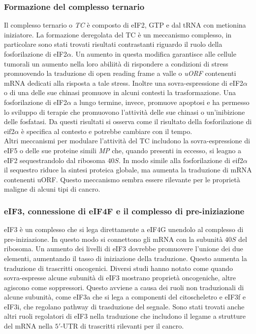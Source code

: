 		\subsubsection{Formazione del complesso ternario}
		Il complesso ternario o \emph{TC} \`e composto di eIF2, GTP e dal tRNA con metionina iniziatore.
		La formazione deregolata del TC \`e un meccanismo complesso, in particolare sono stati trovati risultati contrastanti riguardo il ruolo della fosforilazione di eIF2$\alpha$.
		Un aumento in questa modifica garantisce alle cellule tumorali un aumento nella loro abiliit\`a di rispondere a condizioni di stress promuovendo la traduzione di open reading frame a valle o \emph{uORF} contenenti mRNA dedicati alla risposta a tale stress.
		Inoltre una sovra-espressione di eIF2$\alpha$ o di una delle sue chinasi promuove in alcuni contesti la trasformazione.
		Una fosforilazione di eIF2$\alpha$ a lungo termine, invece, promuove apoptosi e ha permesso lo sviluppo di terapie che promuovono l'attivit\`a delle sue chinasi o un'inibizione delle fosfatasi.
		Da questi risultati si osserva come il risultato della fosforilazione di eif2$\alpha$ \`e specifica al contesto e potrebbe cambiare con il tempo.\\
		Altri meccanismi per modulare l'attivit\`a del TC includono la sovra-espressione di eIF5 o delle sue proteine simili \emph{MP} che, quando presenti in eccesso, si leagno a eIF2 sequestrandolo dal ribosoma $40S$.
		In modo simile alla fosforilazione di eif2$\alpha$ il sequestro riduce la sintesi proteica globale, ma aumenta la traduzione di mRNA contenenti uORF.
		Questo meccanismo sembra essere rilevante per le propriet\`a maligne di alcuni tipi di cancro.

		\subsubsection{eIF3, connessione di eIF4F e il complesso di pre-iniziazione}
		eIF3 \`e un complesso che si lega direttamente a eIF4G unendolo al complesso di pre-iniziazione.
		In questo modo si connettono gli mRNA con la subunit\`a $40S$ del ribosoma.
		Un aumento dei livelli di eIF3 dovrebbe promuovere l'unione dei due elementi, aumentando il tasso di iniziazione della traduzione.
		Questo aumenta la traduzione di trascritti oncogenici.
		Diversi studi hanno notato come quando sovra-espresse alcune subunit\`a di eIF3 mostrano propriet\`a oncogeniche, altre agiscono come soppressori.
		Questo avviene a causa dei ruoli non traduzionali di alcune subunit\`a, come eIF3a che si lega a componenti del citoscheletro e eIF3f e eIF3i, che regolano pathway di trasduzione del segnale.
		Sono stati trovati anche altri ruoli regolatori di eIF3 nella traduzione che includono il legame a strutture del mRNA nella $5'$-UTR di trascritti rilevanti per il cancro.

